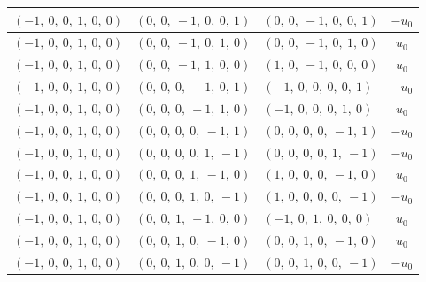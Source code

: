 \documentclass[11pt]{article}
\theoremstyle{definition}
\begin{document}
\begin{longtable}{|l|l|l|c|}
    \hline
    $\left( -1, \  0, \  0, \  1, \  0, \  0\right)$ & $\left( 0, \  0, \  -1, \  0, \  0, \  1\right)$ & $\left( 0, \  0, \  -1, \  0, \  0, \  1\right)$ & $- u_{0}$ \\
    \hline
    $\left( -1, \  0, \  0, \  1, \  0, \  0\right)$ & $\left( 0, \  0, \  -1, \  0, \  1, \  0\right)$ & $\left( 0, \  0, \  -1, \  0, \  1, \  0\right)$ & $u_{0}$ \\
    \hline
    $\left( -1, \  0, \  0, \  1, \  0, \  0\right)$ & $\left( 0, \  0, \  -1, \  1, \  0, \  0\right)$ & $\left( 1, \  0, \  -1, \  0, \  0, \  0\right)$ & $u_{0}$ \\
    \hline
    $\left( -1, \  0, \  0, \  1, \  0, \  0\right)$ & $\left( 0, \  0, \  0, \  -1, \  0, \  1\right)$ & $\left( -1, \  0, \  0, \  0, \  0, \  1\right)$ & $- u_{0}$ \\
    \hline
    $\left( -1, \  0, \  0, \  1, \  0, \  0\right)$ & $\left( 0, \  0, \  0, \  -1, \  1, \  0\right)$ & $\left( -1, \  0, \  0, \  0, \  1, \  0\right)$ & $u_{0}$ \\
    \hline
    $\left( -1, \  0, \  0, \  1, \  0, \  0\right)$ & $\left( 0, \  0, \  0, \  0, \  -1, \  1\right)$ & $\left( 0, \  0, \  0, \  0, \  -1, \  1\right)$ & $- u_{0}$ \\
    \hline
    $\left( -1, \  0, \  0, \  1, \  0, \  0\right)$ & $\left( 0, \  0, \  0, \  0, \  1, \  -1\right)$ & $\left( 0, \  0, \  0, \  0, \  1, \  -1\right)$ & $- u_{0}$ \\
    \hline
    $\left( -1, \  0, \  0, \  1, \  0, \  0\right)$ & $\left( 0, \  0, \  0, \  1, \  -1, \  0\right)$ & $\left( 1, \  0, \  0, \  0, \  -1, \  0\right)$ & $u_{0}$ \\
    \hline
    $\left( -1, \  0, \  0, \  1, \  0, \  0\right)$ & $\left( 0, \  0, \  0, \  1, \  0, \  -1\right)$ & $\left( 1, \  0, \  0, \  0, \  0, \  -1\right)$ & $- u_{0}$ \\
    \hline
    $\left( -1, \  0, \  0, \  1, \  0, \  0\right)$ & $\left( 0, \  0, \  1, \  -1, \  0, \  0\right)$ & $\left( -1, \  0, \  1, \  0, \  0, \  0\right)$ & $u_{0}$ \\
    \hline
    $\left( -1, \  0, \  0, \  1, \  0, \  0\right)$ & $\left( 0, \  0, \  1, \  0, \  -1, \  0\right)$ & $\left( 0, \  0, \  1, \  0, \  -1, \  0\right)$ & $u_{0}$ \\
    \hline
    $\left( -1, \  0, \  0, \  1, \  0, \  0\right)$ & $\left( 0, \  0, \  1, \  0, \  0, \  -1\right)$ & $\left( 0, \  0, \  1, \  0, \  0, \  -1\right)$ & $- u_{0}$ \\

\end{longtable}
\end{document}
